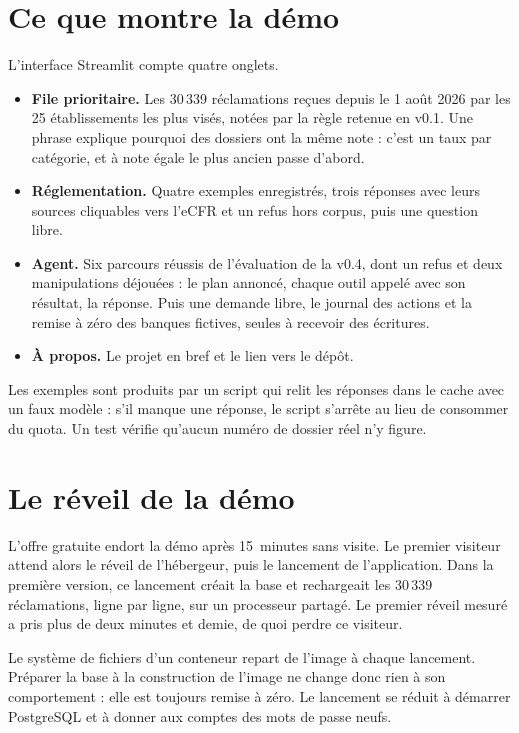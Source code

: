 \documentclass[11pt,a4paper]{article}
\begin{document}
\section{Ce que montre la démo}

L'interface Streamlit compte quatre onglets.
\begin{itemize}
  \item \textbf{File prioritaire.} Les 30\,339 réclamations reçues depuis le 1 août 2026 par les 25 établissements les plus visés, notées par la règle retenue en v0.1. Une phrase explique pourquoi des dossiers ont la même note : c'est un taux par catégorie, et à note égale le plus ancien passe d'abord.
  \item \textbf{Réglementation.} Quatre exemples enregistrés, trois réponses avec leurs sources cliquables vers l'eCFR et un refus hors corpus, puis une question libre.
  \item \textbf{Agent.} Six parcours réussis de l'évaluation de la v0.4, dont un refus et deux manipulations déjouées : le plan annoncé, chaque outil appelé avec son résultat, la réponse. Puis une demande libre, le journal des actions et la remise à zéro des banques fictives, seules à recevoir des écritures.
  \item \textbf{À propos.} Le projet en bref et le lien vers le dépôt.
\end{itemize}

Les exemples sont produits par un script qui relit les réponses dans le cache avec un faux modèle : s'il manque une réponse, le script s'arrête au lieu de consommer du quota. Un test vérifie qu'aucun numéro de dossier réel n'y figure.

\newpage
\section{Le réveil de la démo}

L'offre gratuite endort la démo après 15~minutes sans visite. Le premier visiteur attend alors le réveil de l'hébergeur, puis le lancement de l'application. Dans la première version, ce lancement créait la base et rechargeait les 30\,339 réclamations, ligne par ligne, sur un processeur partagé. Le premier réveil mesuré a pris plus de deux minutes et demie, de quoi perdre ce visiteur.

Le système de fichiers d'un conteneur repart de l'image à chaque lancement. Préparer la base à la construction de l'image ne change donc rien à son comportement : elle est toujours remise à zéro. Le lancement se réduit à démarrer PostgreSQL et à donner aux comptes des mots de passe neufs.
\end{document}
